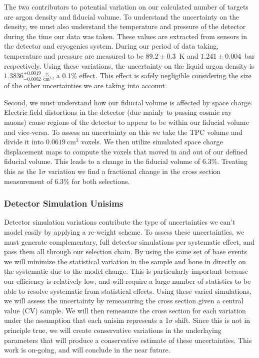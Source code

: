 The two contributors to potential variation on our calculated number of targets are argon density and fiducial volume. To understand the uncertainty on the density, we must also understand the temperature and pressure of the detector during the time our data was taken. These values are extracted from sensors in the detector and cryogenics system. During our period of data taking, temperature and pressure are measured to be $89.2 \pm 0.3$~K and $1.241 \pm 0.004$~bar respectively. Using these variations, the uncertainty on the liquid argon density is $1.3836^{+0.0019}_{-0.0002}~\frac{\text{g}}{\text{cm}^3}$, a 0.1\% effect. This effect is safely negligible considering the size of the other uncertainties we are taking into account.
\par Second, we must understand how our fiducial volume is affected by space charge. Electric field distortions in the detector (due mainly to passing cosmic ray muons) cause regions of the detector to appear to be within our fiducial volume and vice-versa. To assess an uncertainty on this we take the TPC volume and divide it into $0.0619~\text{cm}^3$ voxels. We then utilize simulated space charge displacement maps to compute the voxels that moved in and out of our defined fiducial volume. This leads to a change in the fiducial volume of 6.3\%. Treating this as the 1$\sigma$ variation we find a fractional change in the cross section measurement of 6.3\% for both selections. 



\subsubsection{Detector Simulation Unisims}
Detector simulation variations contribute the type of uncertainties we can't model easily by applying a re-weight scheme. To assess these uncertainties, we must generate complementary, full detector simulations per systematic effect, and pass them all through our selection chain. By using the same set of base events we will minimize the statistical variation in the sample and hone in directly on the systematic due to the model change.  This is particularly important because our efficiency is relatively low, and will require a large number of statistics to be able to resolve systematic from statistical effects.  Using these varied simulations, we will assess the uncertainty by remeasuring the cross section given a central value (CV) sample.  We will then remeasure the cross section for each variation under the assumption that each unisim represents a 1$\sigma$ shift. Since this is not in principle true, we will create conservative variations in the underlaying parameters that will produce a conservative estimate of these uncertainties. This work is on-going, and will conclude in the near future. 

